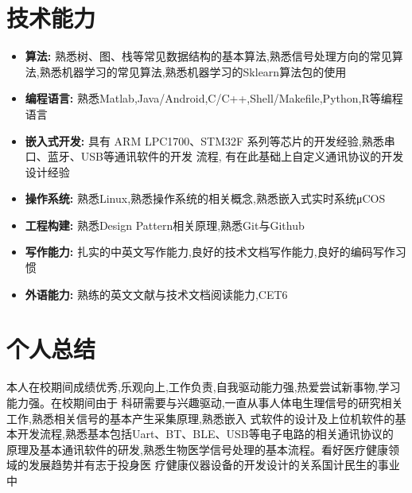 \documentclass{resume}
\begin{document}
\section{技术能力}
\begin{itemize}[parsep=0.2ex]
  \item \textbf{算法:} 熟悉树、图、栈等常见数据结构的基本算法,熟悉信号处理方向的常见算法,熟悉机器学习的常见算法,熟悉机器学习的Sklearn算法包的使用
  \item \textbf{编程语言:} 熟悉Matlab,Java/Android,C/C++,Shell/Makefile,Python,R等编程语言
  \item \textbf{嵌入式开发:} 具有 ARM LPC1700、STM32F 系列等芯片的开发经验,熟悉串口、蓝牙、USB等通讯软件的开发
流程, 有在此基础上自定义通讯协议的开发设计经验
  \item \textbf{操作系统:} 熟悉Linux,熟悉操作系统的相关概念,熟悉嵌入式实时系统μCOS
  \item \textbf{工程构建:} 熟悉Design Pattern相关原理,熟悉Git与Github
  \item \textbf{写作能力:} 扎实的中英文写作能力,良好的技术文档写作能力,良好的编码写作习惯
  \item \textbf{外语能力:} 熟练的英文文献与技术文档阅读能力,CET6
\end{itemize}

\section{个人总结}
本人在校期间成绩优秀,乐观向上,工作负责,自我驱动能力强,热爱尝试新事物,学习能力强。在校期间由于
科研需要与兴趣驱动,一直从事人体电生理信号的研究相关工作,熟悉相关信号的基本产生采集原理,熟悉嵌入
式软件的设计及上位机软件的基本开发流程,熟悉基本包括Uart、BT、BLE、USB等电子电路的相关通讯协议的
原理及基本通讯软件的研发,熟悉生物医学信号处理的基本流程。看好医疗健康领域的发展趋势并有志于投身医
疗健康仪器设备的开发设计的关系国计民生的事业中
%
%
\end{document}
